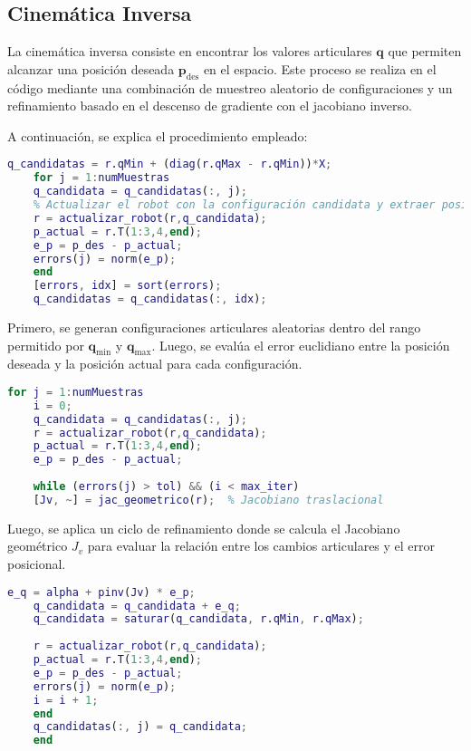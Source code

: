 \subsection{Cinemática Inversa}


La cinemática inversa consiste en encontrar los valores articulares \( \mathbf{q} \) que permiten alcanzar una posición deseada \( \mathbf{p}_{\text{des}} \) en el espacio. Este proceso se realiza en el código mediante una combinación de muestreo aleatorio de configuraciones y un refinamiento basado en el descenso de gradiente con el jacobiano inverso.

A continuación, se explica el procedimiento empleado:

\begin{lstlisting}[language=Matlab, caption={Generación de configuraciones candidatas y cálculo de errores}]
	q_candidatas = r.qMin + (diag(r.qMax - r.qMin))*X;
	for j = 1:numMuestras
	q_candidata = q_candidatas(:, j);
	% Actualizar el robot con la configuración candidata y extraer posición actual
	r = actualizar_robot(r,q_candidata);
	p_actual = r.T(1:3,4,end);
	e_p = p_des - p_actual;
	errors(j) = norm(e_p);
	end
	[errors, idx] = sort(errors);
	q_candidatas = q_candidatas(:, idx);
\end{lstlisting}

Primero, se generan configuraciones articulares aleatorias dentro del rango permitido por \( \mathbf{q}_{\text{min}} \) y \( \mathbf{q}_{\text{max}} \). Luego, se evalúa el error euclidiano entre la posición deseada y la posición actual para cada configuración.

\begin{lstlisting}[language=Matlab, caption={Aplicación del descenso de gradiente para refinar cada configuración}]
	for j = 1:numMuestras
	i = 0;
	q_candidata = q_candidatas(:, j);
	r = actualizar_robot(r,q_candidata);
	p_actual = r.T(1:3,4,end);
	e_p = p_des - p_actual;
	
	while (errors(j) > tol) && (i < max_iter)
	[Jv, ~] = jac_geometrico(r);  % Jacobiano traslacional
\end{lstlisting}

Luego, se aplica un ciclo de refinamiento donde se calcula el Jacobiano geométrico \( J_v \) para evaluar la relación entre los cambios articulares y el error posicional.

\begin{lstlisting}[language=Matlab, caption={Corrección articular y saturación de límites}]
	e_q = alpha + pinv(Jv) * e_p;
	q_candidata = q_candidata + e_q;
	q_candidata = saturar(q_candidata, r.qMin, r.qMax);
	
	r = actualizar_robot(r,q_candidata);
	p_actual = r.T(1:3,4,end);
	e_p = p_des - p_actual;
	errors(j) = norm(e_p);
	i = i + 1;
	end
	q_candidatas(:, j) = q_candidata;
	end
\end{lstlisting}


